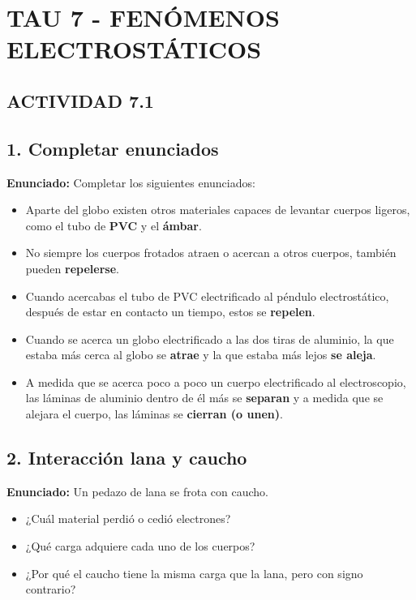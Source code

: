 \documentclass[12pt, letterpaper]{article}
\begin{document}
\newpage
\section*{TAU 7 - FENÓMENOS ELECTROSTÁTICOS}

\subsection*{ACTIVIDAD 7.1}

\subsection*{1. Completar enunciados}
\noindent \textbf{Enunciado:} Completar los siguientes enunciados: %
\begin{itemize}
	\item[a.] Aparte del globo existen otros materiales capaces de levantar cuerpos ligeros, como el tubo de \textbf{\color{blue}PVC} y el \textbf{\color{blue}ámbar}. %
	\item[b.] No siempre los cuerpos frotados atraen o acercan a otros cuerpos, también pueden \textbf{\color{blue}repelerse}. %
	\item[c.] Cuando acercabas el tubo de PVC electrificado al péndulo electrostático, después de estar en contacto un tiempo, estos se \textbf{\color{blue}repelen}. %
	\item[d.] Cuando se acerca un globo electrificado a las dos tiras de aluminio, la que estaba más cerca al globo se \textbf{\color{blue}atrae} y la que estaba más lejos \textbf{\color{blue}se aleja}. %
	\item[e.] A medida que se acerca poco a poco un cuerpo electrificado al electroscopio, las láminas de aluminio dentro de él más se \textbf{\color{blue}separan} y a medida que se alejara el cuerpo, las láminas se \textbf{\color{blue}cierran (o unen)}. %
\end{itemize}

\subsection*{2. Interacción lana y caucho}
\noindent \textbf{Enunciado:} Un pedazo de lana se frota con caucho. %
\begin{itemize}
	\item[a.] ¿Cuál material perdió o cedió electrones? %
	\item[b.] ¿Qué carga adquiere cada uno de los cuerpos? %
	\item[c.] ¿Por qué el caucho tiene la misma carga que la lana, pero con signo contrario? %
\end{itemize}
\end{document}
